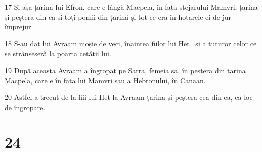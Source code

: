 \par 17 Și așa țarina lui Efron, care e lângă Macpela, în fața stejarului Mamvri, țarina și peștera din ea și toți pomii din țarină și tot ce era în hotarele ei de jur împrejur
\par 18 S-au dat lui Avraam moșie de veci, înaintea fiilor lui Het  și a tuturor celor ce se strânseseră la poarta cetății lui.
\par 19 După aceasta Avraam a îngropat pe Sarra, femeia sa, în peștera din țarina Macpela, care e în fața lui Mamvri sau a Hebronului, în Canaan.
\par 20 Astfel a trecut de la fiii lui Het la Avraam țarina și peștera cea din ea, ca loc de îngropare.

\chapter{24}

